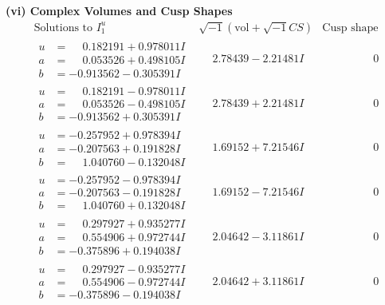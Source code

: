 \documentclass[1p]{elsarticle_modified}
\theoremstyle{definition}
\newcommand{\I}{\sqrt{-1}}
\begin{document}
\newpage\flushleft \textbf{(vi) Complex Volumes and Cusp Shapes}
$$\begin{array}{c|c|c}  
\text{Solutions to }I^u_{1}& \I (\text{vol} + \sqrt{-1}CS) & \text{Cusp shape}\\
 \hline 
\begin{aligned}
u &= \phantom{-}0.182191 + 0.978011 I \\
a &= \phantom{-}0.053526 + 0.498105 I \\
b &= -0.913562 - 0.305391 I\end{aligned}
 & \phantom{-}2.78439 - 2.21481 I & \phantom{-0.000000 } 0 \\ \hline\begin{aligned}
u &= \phantom{-}0.182191 - 0.978011 I \\
a &= \phantom{-}0.053526 - 0.498105 I \\
b &= -0.913562 + 0.305391 I\end{aligned}
 & \phantom{-}2.78439 + 2.21481 I & \phantom{-0.000000 } 0 \\ \hline\begin{aligned}
u &= -0.257952 + 0.978394 I \\
a &= -0.207563 + 0.191828 I \\
b &= \phantom{-}1.040760 - 0.132048 I\end{aligned}
 & \phantom{-}1.69152 + 7.21546 I & \phantom{-0.000000 } 0 \\ \hline\begin{aligned}
u &= -0.257952 - 0.978394 I \\
a &= -0.207563 - 0.191828 I \\
b &= \phantom{-}1.040760 + 0.132048 I\end{aligned}
 & \phantom{-}1.69152 - 7.21546 I & \phantom{-0.000000 } 0 \\ \hline\begin{aligned}
u &= \phantom{-}0.297927 + 0.935277 I \\
a &= \phantom{-}0.554906 + 0.972744 I \\
b &= -0.375896 + 0.194038 I\end{aligned}
 & \phantom{-}2.04642 - 3.11861 I & \phantom{-0.000000 } 0 \\ \hline\begin{aligned}
u &= \phantom{-}0.297927 - 0.935277 I \\
a &= \phantom{-}0.554906 - 0.972744 I \\
b &= -0.375896 - 0.194038 I\end{aligned}
 & \phantom{-}2.04642 + 3.11861 I & \phantom{-0.000000 } 0 \\ \hline\begin{aligned}

\end{aligned}
\end{array}$$
\end{document}
